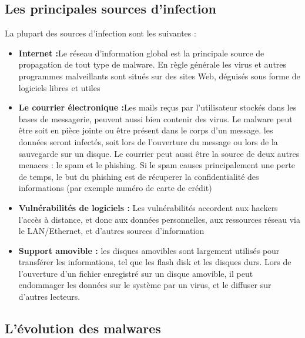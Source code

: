 \subsection{Les principales sources d'infection}
La plupart des sources d'infection sont les suivantes :\\


\begin{itemize}
\item \textbf{Internet :}Le réseau d'information global est la principale source de propagation de tout type de malware. En règle générale les virus et autres programmes malveillants sont situés sur des sites Web, déguisés sous forme de logiciels libres et utiles\\


\item \textbf{Le courrier électronique :}Les mails reçus par l'utilisateur stockés dans les bases de messagerie, peuvent aussi bien contenir des virus. Le malware peut être soit en pièce jointe ou être présent dans le corps d'un message. les données seront infectés, soit lors de l'ouverture du message ou lors de la sauvegarde sur un disque. Le courrier peut aussi être la source de deux autres menaces : le spam et le phishing. Si le spam causes principalement une perte de temps, le but du phishing est de récuperer la confidentialité des informations (par exemple numéro de carte de crédit)\\


\item \textbf{Vulnérabilités de logiciels :} Les vulnérabilités accordent aux hackers l'accès à distance, et donc aux données personnelles, aux ressources réseau via le LAN/Ethernet, et d'autres sources d'information\\


\item \textbf{Support amovible :} les disques amovibles sont largement utilisés pour transférer les informations, tel que les flash disk et les disques durs. Lors de l'ouverture d'un fichier enregistré sur un disque amovible, il peut endommager les données sur le système par un virus, et le diffuser sur d'autres lecteurs. 
\end{itemize}
\subsection{L'évolution des malwares}

